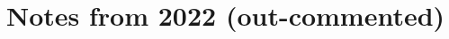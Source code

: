 \documentclass{report}
\begin{document}
\chapter{Notes from 2022 (out-commented)} \label{notes_from_2022}




\begin{comment}

Disse noter er bare nogle korte ting, som jeg ikke har lyst til at skrive ind i mit nuværende "main-tex"-dokument (altså mit 2021-22-notesæt), og jeg gider heller ikke starte et nyt (2022-xx-)notesæt lige nu, bare for det.. Så dette dokument bliver altså et slags mellemled. (08.07.22, 12:19)



## Tanker fra i morges (08.07.22) omkring bl.a. børneopdragelse, men også meget mere


\end{comment}
\end{document}

